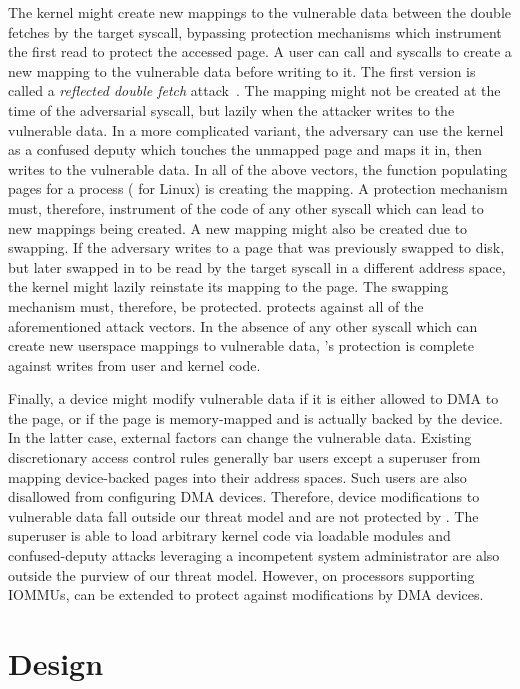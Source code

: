 \documentclass[letterpaper,twocolumn,10pt, anonymous]{article}
\begin{document}
The kernel might create new mappings to the vulnerable data 
between the double fetches by the target syscall, bypassing protection 
mechanisms which instrument the first read to protect the accessed page.
A user can call  and  syscalls to create 
a new mapping to the vulnerable data before writing to it.
The first version is called a \emph{reflected double fetch} 
attack~\cite{watson2007exploiting}.
The mapping might not be created at the time of the adversarial syscall, 
but lazily when the attacker writes to the vulnerable data.
In a more complicated variant, the adversary can use the kernel as a 
confused deputy which touches the unmapped page and maps it in, 
then writes to the vulnerable data.
In all of the above vectors, the function populating pages for a 
process ( for Linux) is creating the mapping.
A protection mechanism must, therefore, instrument 
of the code of any other syscall which can lead to new mappings 
being created.
A new mapping might also be created due to swapping.
If the adversary writes to a page that was previously swapped 
to disk, but later swapped in to be read by the target syscall in 
a different address space, the kernel might lazily reinstate its 
mapping to the page.
The swapping mechanism must, therefore, be protected.
\tiktok protects against all of the aforementioned attack vectors.
In the absence of any other syscall which can create new userspace 
mappings to vulnerable data, \tiktok's protection is complete 
against writes from user and kernel code.

Finally, a device might modify vulnerable data if it is either 
allowed to DMA to the page, or if the page is memory-mapped and is 
actually backed by the device.
In the latter case, external factors can change the vulnerable 
data.
Existing discretionary access control rules generally bar users 
except a superuser from mapping device-backed pages into their
address spaces.
Such users are also disallowed from configuring DMA devices.
Therefore, device modifications to vulnerable data fall outside 
our threat model and are not protected by \tiktok.
The superuser is able to load arbitrary kernel code via loadable
modules and confused-deputy attacks leveraging a incompetent 
system administrator are also outside the purview of our threat model.
However, on processors supporting IOMMUs, \tiktok can be extended 
to protect against modifications by DMA devices.


\section{\tiktok Design} 
\label{sec:design}
\end{document}
